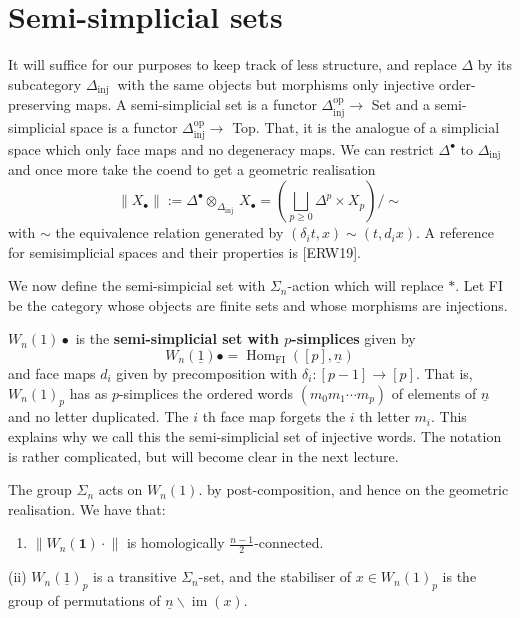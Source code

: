 \section{Semi-simplicial sets}

It will suffice for our purposes to keep track of less structure, and replace $\Delta$ by its subcategory $\Delta_{\text {inj }}$ with the same objects but morphisms only injective order-preserving maps. A semi-simplicial set is a functor $\Delta_{\mathrm{inj}}^{\mathrm{op}} \rightarrow$ Set and a semi-simplicial space is a functor $\Delta_{\mathrm{inj}}^{\mathrm{op}} \rightarrow$ Top. That, it is the analogue of a simplicial space which only face maps and no degeneracy maps. We can restrict $\Delta^{\bullet}$ to $\Delta_{\text {inj }}$ and once more take the coend to get a geometric realisation
$$
\left\|X_{\bullet}\right\|:=\Delta^{\bullet} \otimes_{\Delta_{\text {inj }}} X_{\bullet}=\left(\bigsqcup_{p \geq 0} \Delta^p \times X_p\right) / \sim
$$
with $\sim$ the equivalence relation generated by $\left(\delta_i t, x\right) \sim\left(t, d_i x\right)$. A reference for semisimplicial spaces and their properties is [ERW19].

We now define the semi-simpicial set with $\Sigma_n$-action which will replace $*$. Let FI be the category whose objects are finite sets and whose morphisms are injections.

$W_n(1) \bullet$ is the \textbf{semi-simplicial set with $p$-simplices} given by
$$
W_n(\underline{1}) \bullet=\operatorname{Hom}_{\mathrm{FI}}([p], \underline{n})
$$
and face maps $d_i$ given by precomposition with $\delta_i:[p-1] \rightarrow[p]$.
That is, $W_n(1)_p$ has as $p$-simplices the ordered words $\left(m_0 m_1 \cdots m_p\right)$ of elements of $\underline{n}$ and no letter duplicated. The $i$ th face map forgets the $i$ th letter $m_i$. This explains why we call this the semi-simplicial set of injective words. The notation is rather complicated, but will become clear in the next lecture.

The group $\Sigma_n$ acts on $W_n(1)$. by post-composition, and hence on the geometric realisation. We have that:

\begin{prop}
    \begin{enumerate}
        \item $\left\|W_n(\mathbf{1}) \cdot\right\|$ is homologically $\frac{n-1}{2}$-connected.
    \end{enumerate}
\end{prop}
(ii) $W_n(\underline{1})_p$ is a transitive $\Sigma_n$-set, and the stabiliser of $x \in W_n(1)_p$ is the group of permutations of $\underline{n} \backslash \operatorname{im}(x)$.

